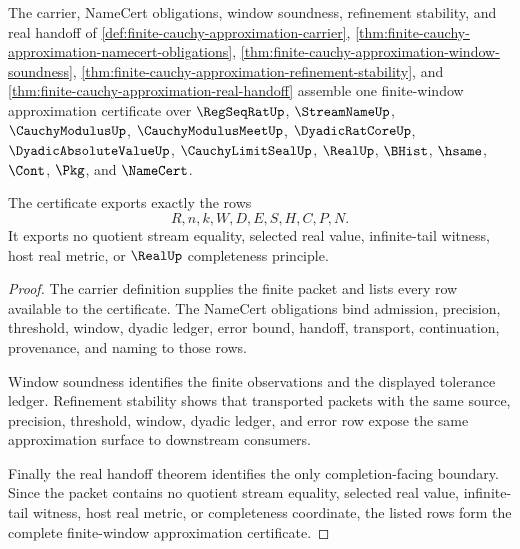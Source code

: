 \begin{theorem}
\label{thm:finite-cauchy-approximation-observation-surface}
The carrier, NameCert obligations, window soundness, refinement stability, and real handoff of \autoref{def:finite-cauchy-approximation-carrier}, \autoref{thm:finite-cauchy-approximation-namecert-obligations}, \autoref{thm:finite-cauchy-approximation-window-soundness}, \autoref{thm:finite-cauchy-approximation-refinement-stability}, and \autoref{thm:finite-cauchy-approximation-real-handoff} assemble one finite-window approximation certificate over $\RegSeqRatUp$, $\StreamNameUp$, $\CauchyModulusUp$, $\CauchyModulusMeetUp$, $\DyadicRatCoreUp$, $\DyadicAbsoluteValueUp$, $\CauchyLimitSealUp$, $\RealUp$, $\BHist$, $\hsame$, $\Cont$, $\Pkg$, and $\NameCert$.

The certificate exports exactly the rows
$$
R,n,k,W,D,E,S,H,C,P,N.
$$
It exports no quotient stream equality, selected real value, infinite-tail witness, host real metric, or $\RealUp$ completeness principle.
\end{theorem}
\begin{proof}
The carrier definition supplies the finite packet and lists every row available to the certificate. The NameCert obligations bind admission, precision, threshold, window, dyadic ledger, error bound, handoff, transport, continuation, provenance, and naming to those rows.

Window soundness identifies the finite observations and the displayed tolerance ledger. Refinement stability shows that transported packets with the same source, precision, threshold, window, dyadic ledger, and error row expose the same approximation surface to downstream consumers.

Finally the real handoff theorem identifies the only completion-facing boundary. Since the packet contains no quotient stream equality, selected real value, infinite-tail witness, host real metric, or completeness coordinate, the listed rows form the complete finite-window approximation certificate.
\end{proof}

